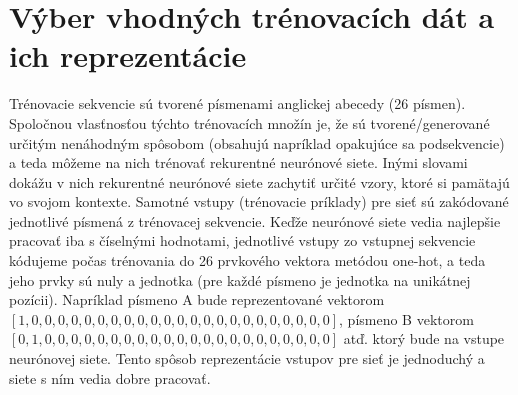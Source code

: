\section{Výber vhodných trénovacích dát a ich reprezentácie}
Trénovacie sekvencie sú tvorené písmenami anglickej abecedy (26 písmen).
Spoločnou vlasťnosťou týchto trénovacích množín je, že sú tvorené/generované určitým nenáhodným spôsobom (obsahujú napríklad opakujúce sa podsekvencie)
a teda môžeme na nich trénovať rekurentné neurónové siete. 
Inými slovami dokážu v nich rekurentné neurónové siete zachytiť určité vzory, ktoré si pamätajú vo svojom kontexte.
Samotné vstupy (trénovacie príklady) pre sieť sú zakódované jednotlivé písmená z trénovacej sekvencie.
Keďže neurónové siete vedia najlepšie pracovať iba s číselnými hodnotami, jednotlivé vstupy zo 
vstupnej sekvencie kódujeme počas trénovania do 26 prvkového vektora metódou one-hot, 
a teda jeho prvky sú nuly a jednotka (pre každé písmeno je jednotka na unikátnej pozícii).
Napríklad písmeno A bude reprezentované vektorom
$[1, 0, 0, 0, 0, 0, 0, 0, 0, 0, 0, 0, 0, 0, 0, 0, 0, 0, 0, 0, 0, 0, 0, 0]$,
písmeno B vektorom $[0, 1, 0, 0, 0, 0, 0, 0, 0, 0, 0, 0, 0, 0, 0, 0, 0, 0, 0, 0, 0, 0, 0, 0]$ atď. 
ktorý bude na vstupe neurónovej siete.
Tento spôsob reprezentácie vstupov pre sieť je jednoduchý a siete s ním vedia dobre pracovať.


%









